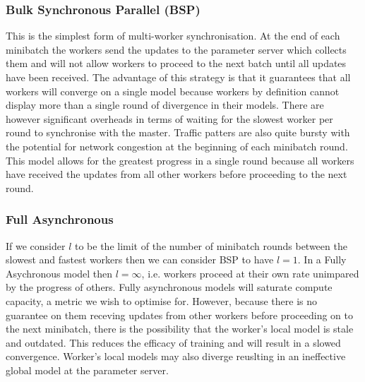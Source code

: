 \documentclass[12pt]{article}
\begin{document}
\subsubsection{Bulk Synchronous Parallel (BSP)}
This is the simplest form of multi-worker synchronisation. At the end of each minibatch the workers send the updates to the parameter server which collects them and will not allow workers to proceed to the next batch until all updates have been received. The advantage of this strategy is that it guarantees that all workers will converge on a single model because workers by definition cannot display more than a single round of divergence in their models. There are however significant overheads in terms of waiting for the slowest worker per round to synchronise with the master. Traffic patters are also quite bursty with the potential for network congestion at the beginning of each minibatch round. This model allows for the greatest progress in a single round because all workers have received the updates from all other workers before proceeding to the next round.

\subsubsection{Full Asynchronous}
If we consider $l$ to be the limit of the number of minibatch rounds between the slowest and fastest workers then we can consider BSP to have $l = 1$. In a Fully Asychronous model then $l = \infty$, i.e. workers proceed at their own rate unimpared by the progress of others. Fully asynchronous models will saturate compute capacity, a metric we wish to optimise for. However, because there is no guarantee on them receving updates from other workers before proceeding on to the next minibatch, there is the possibility that the worker's local model is stale and outdated. This reduces the efficacy of training and will result in a slowed convergence. Worker's local models may also diverge reuslting in an ineffective global model at the parameter server.
\end{document}
